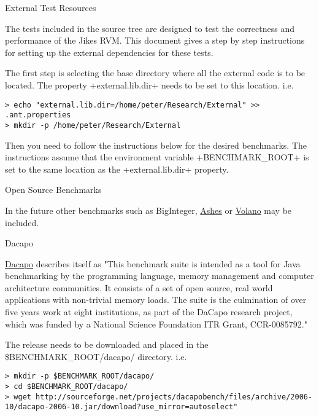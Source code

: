\begin{section}{External Test Resources}
\label{sec:externaltestresources}

The tests included in the source tree are designed to test the correctness and performance of the Jikes RVM. This document gives a step by step instructions for setting up the external dependencies for these tests.

The first step is selecting the base directory where all the external code is to be located. The property \spverb+external.lib.dir+ needs to be set to this location. i.e.

\begin{lstlisting}[breaklines=true, breakatwhitespace=false]
> echo "external.lib.dir=/home/peter/Research/External" >> .ant.properties
> mkdir -p /home/peter/Research/External
\end{lstlisting}

Then you need to follow the instructions below for the desired benchmarks. The instructions assume that the environment variable \spverb+BENCHMARK_ROOT+ is set to the same location as the \spverb+external.lib.dir+ property.

\begin{subsection}{Open Source Benchmarks}

In the future other benchmarks such as BigInteger, \href{http://www.sable.mcgill.ca/ashes/}{Ashes} or \href{http://www.volano.com/benchmarks.html}{Volano} may be included.

\begin{subsubsection}{Dacapo}

\href{http://dacapobench.org}{Dacapo} describes itself as "This benchmark suite is intended as a tool for Java benchmarking by the programming language, memory management and computer architecture communities. It consists of a set of open source, real world applications with non-trivial memory loads. The suite is the culmination of over five years work at eight institutions, as part of the DaCapo research project, which was funded by a National Science Foundation ITR Grant, CCR-0085792."

The release needs to be downloaded and placed in the \$BENCHMARK\_ROOT/dacapo/ directory. i.e.

\begin{lstlisting}[breaklines=true, breakatwhitespace=false]
> mkdir -p $BENCHMARK_ROOT/dacapo/
> cd $BENCHMARK_ROOT/dacapo/
> wget http://sourceforge.net/projects/dacapobench/files/archive/2006-10/dacapo-2006-10.jar/download?use_mirror=autoselect"
\end{lstlisting}


\end{subsubsection}
\end{subsection}
\end{section}
